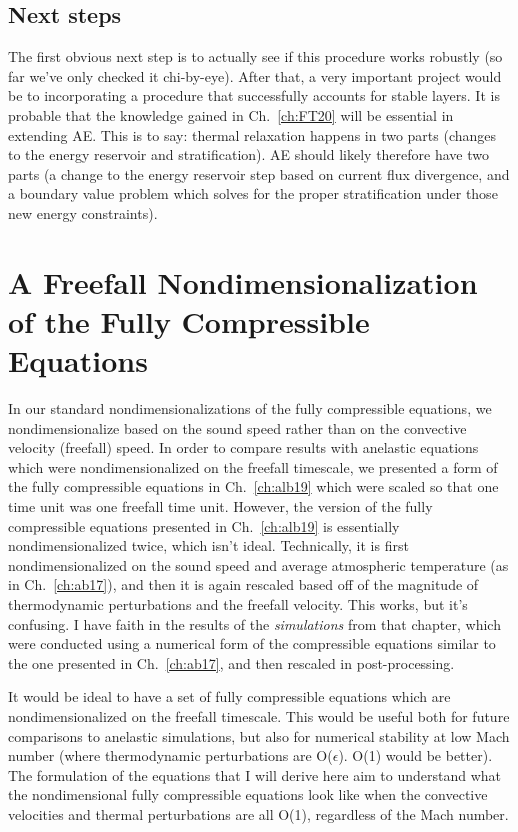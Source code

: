 \subsection{Next steps}
The first obvious next step is to actually see if this procedure works robustly (so far we've only checked it chi-by-eye).
After that, a very important project would be to incorporating a procedure that successfully accounts for stable layers.
It is probable that the knowledge gained in Ch.~\ref{ch:FT20} will be essential in extending AE.
This is to say: thermal relaxation happens in two parts (changes to the energy reservoir and stratification).
AE should likely therefore have two parts (a change to the energy reservoir step based on current flux divergence, and a boundary value problem which solves for the proper stratification under those new energy constraints).


\section{A Freefall Nondimensionalization of the Fully Compressible Equations}
In our standard nondimensionalizations of the fully compressible equations, we nondimensionalize based on the sound speed rather than on the convective velocity (freefall) speed.
In order to compare results with anelastic equations which were nondimensionalized on the freefall timescale, we presented a form of the fully compressible equations in Ch.~\ref{ch:alb19} which were scaled so that one time unit was one freefall time unit. 
However, the version of the fully compressible equations presented in Ch.~\ref{ch:alb19} is essentially nondimensionalized twice, which isn't ideal.
Technically, it is first nondimensionalized on the sound speed and average atmospheric temperature (as in Ch.~\ref{ch:ab17}), and then it is again rescaled based off of the magnitude of thermodynamic perturbations and the freefall velocity.
This works, but it's confusing.
I have faith in the results of the \emph{simulations} from that chapter, which were conducted using a numerical form of the compressible equations similar to the one presented in Ch.~\ref{ch:ab17}, and then rescaled in post-processing.

It would be ideal to have a set of fully compressible equations which are nondimensionalized on the freefall timescale.
This would be useful both for future comparisons to anelastic simulations, but also for numerical stability at low Mach number (where thermodynamic perturbations are O($\epsilon$). O(1) would be better). 
The formulation of the equations that I will derive here aim to understand what the nondimensional fully compressible equations look like when the convective velocities and thermal perturbations are all O(1), regardless of the Mach number.

